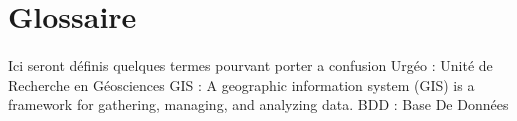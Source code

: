 \section{Glossaire}
\paragraph{}Ici seront définis quelques termes pourvant porter a confusion
Urgéo   : Unité de Recherche en Géosciences
    GIS     : A geographic information system (GIS) is a framework for gathering, managing, and analyzing data.
    BDD : Base De Données